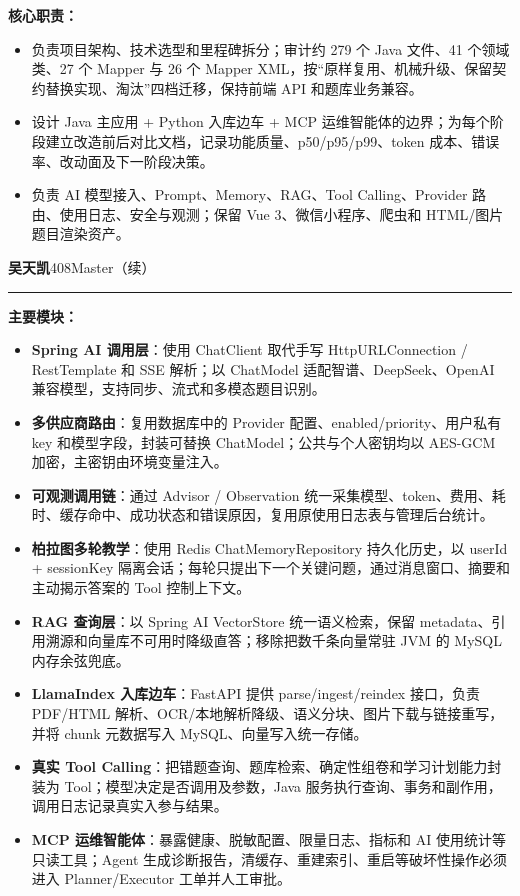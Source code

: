 \textbf{核心职责：}
\begin{itemize}[parsep=0.5ex]
  \item 负责项目架构、技术选型和里程碑拆分；审计约 279 个 Java 文件、41 个领域类、27 个 Mapper 与 26 个 Mapper XML，按“原样复用、机械升级、保留契约替换实现、淘汰”四档迁移，保持前端 API 和题库业务兼容。
  \item 设计 Java 主应用 + Python 入库边车 + MCP 运维智能体的边界；为每个阶段建立改造前后对比文档，记录功能质量、p50/p95/p99、token 成本、错误率、改动面及下一阶段决策。
  \item 负责 AI 模型接入、Prompt、Memory、RAG、Tool Calling、Provider 路由、使用日志、安全与观测；保留 Vue 3、微信小程序、爬虫和 HTML/图片题目渲染资产。
\end{itemize}

\newpage
\noindent\textbf{吴天凯}\hfill 408Master（续）\\[-0.4ex]
{\color{ICBlue}\rule{\textwidth}{0.5pt}}

\textbf{主要模块：}
\begin{itemize}[parsep=0.5ex]
  \item \textbf{Spring AI 调用层}：使用 ChatClient 取代手写 HttpURLConnection / RestTemplate 和 SSE 解析；以 ChatModel 适配智谱、DeepSeek、OpenAI 兼容模型，支持同步、流式和多模态题目识别。
  \item \textbf{多供应商路由}：复用数据库中的 Provider 配置、enabled/priority、用户私有 key 和模型字段，封装可替换 ChatModel；公共与个人密钥均以 AES-GCM 加密，主密钥由环境变量注入。
  \item \textbf{可观测调用链}：通过 Advisor / Observation 统一采集模型、token、费用、耗时、缓存命中、成功状态和错误原因，复用原使用日志表与管理后台统计。
  \item \textbf{柏拉图多轮教学}：使用 Redis ChatMemoryRepository 持久化历史，以 userId + sessionKey 隔离会话；每轮只提出下一个关键问题，通过消息窗口、摘要和主动揭示答案的 Tool 控制上下文。
  \item \textbf{RAG 查询层}：以 Spring AI VectorStore 统一语义检索，保留 metadata、引用溯源和向量库不可用时降级直答；移除把数千条向量常驻 JVM 的 MySQL 内存余弦兜底。
  \item \textbf{LlamaIndex 入库边车}：FastAPI 提供 parse/ingest/reindex 接口，负责 PDF/HTML 解析、OCR/本地解析降级、语义分块、图片下载与链接重写，并将 chunk 元数据写入 MySQL、向量写入统一存储。
  \item \textbf{真实 Tool Calling}：把错题查询、题库检索、确定性组卷和学习计划能力封装为 Tool；模型决定是否调用及参数，Java 服务执行查询、事务和副作用，调用日志记录真实入参与结果。
  \item \textbf{MCP 运维智能体}：暴露健康、脱敏配置、限量日志、指标和 AI 使用统计等只读工具；Agent 生成诊断报告，清缓存、重建索引、重启等破坏性操作必须进入 Planner/Executor 工单并人工审批。
\end{itemize}

